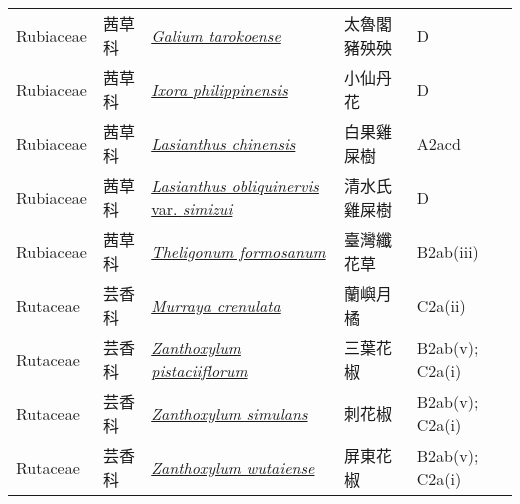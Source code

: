 {\begin{longtable}{p{2.5cm}p{2.5cm}p{4.5cm}p{2.5cm}p{3cm}}
    Rubiaceae & 茜草科 & \href{http://www.theplantlist.org/tpl1.1/search?q=Galium+tarokoense}{\textit{Galium tarokoense} } & 太魯閣豬殃殃 & D \index{Galium@\textit{Galium}!tarokoense@\textit{tarokoense}}  \index{太魯閣豬殃殃} \\
    Rubiaceae & 茜草科 & \href{http://www.theplantlist.org/tpl1.1/search?q=Ixora+philippinensis}{\textit{Ixora philippinensis} } & 小仙丹花 & D \index{Ixora@\textit{Ixora}!philippinensis@\textit{philippinensis}}  \index{小仙丹花} \\
    Rubiaceae & 茜草科 & \href{http://www.theplantlist.org/tpl1.1/search?q=Lasianthus+chinensis}{\textit{Lasianthus chinensis} } & 白果雞屎樹 & A2acd \index{Lasianthus@\textit{Lasianthus}!chinensis@\textit{chinensis}}  \index{白果雞屎樹} \\
    Rubiaceae & 茜草科 & \href{http://www.theplantlist.org/tpl1.1/search?q=Lasianthus+obliquinervis+var.+simizui}{\textit{Lasianthus obliquinervis} var. \textit{simizui} } & 清水氏雞屎樹 & D \index{Lasianthus@\textit{Lasianthus}!obliquinervis@\textit{obliquinervis}!var. simizui@var. \textit{simizui}}  \index{清水氏雞屎樹} \\
    Rubiaceae & 茜草科 & \href{http://www.theplantlist.org/tpl1.1/search?q=Theligonum+formosanum}{\textit{Theligonum formosanum} } & 臺灣纖花草 & B2ab(iii) \index{Theligonum@\textit{Theligonum}!formosanum@\textit{formosanum}}  \index{臺灣纖花草} \\
    Rutaceae & 芸香科 & \href{http://www.theplantlist.org/tpl1.1/search?q=Murraya+crenulata}{\textit{Murraya crenulata} } & 蘭嶼月橘 & C2a(ii) \index{Murraya@\textit{Murraya}!crenulata@\textit{crenulata}}  \index{蘭嶼月橘} \\
    Rutaceae & 芸香科 & \href{http://www.theplantlist.org/tpl1.1/search?q=Zanthoxylum+pistaciiflorum}{\textit{Zanthoxylum pistaciiflorum} } & 三葉花椒 & B2ab(v); C2a(i) \index{Zanthoxylum@\textit{Zanthoxylum}!pistaciiflorum@\textit{pistaciiflorum}}  \index{三葉花椒} \\
    Rutaceae & 芸香科 & \href{http://www.theplantlist.org/tpl1.1/search?q=Zanthoxylum+simulans}{\textit{Zanthoxylum simulans} } & 刺花椒 & B2ab(v); C2a(i) \index{Zanthoxylum@\textit{Zanthoxylum}!simulans@\textit{simulans}}  \index{刺花椒} \\
    Rutaceae & 芸香科 & \href{http://www.theplantlist.org/tpl1.1/search?q=Zanthoxylum+wutaiense}{\textit{Zanthoxylum wutaiense} } & 屏東花椒 & B2ab(v); C2a(i) \index{Zanthoxylum@\textit{Zanthoxylum}!wutaiense@\textit{wutaiense}}  \index{屏東花椒} \\

\end{longtable}}

